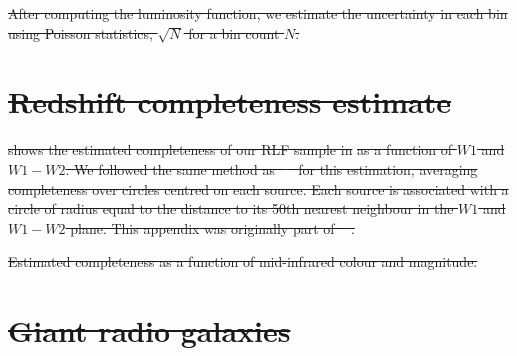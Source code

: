 \documentclass[11pt, a4paper]{book}
\providecommand{\DIFdeltex}[1]{{\protect\color{red}\sout{#1}}}                      %
\providecommand{\DIFdelFL}[1]{\DIFdel{#1}} %
\providecommand{\DIFdel}[1]{\texorpdfstring{\DIFdeltex{#1}}{}} %
\begin{document}
\DIFdel{After computing the luminosity function, we estimate the uncertainty in each bin using Poisson statistics, $\sqrt{N}$ for a bin count $N$.
}%

\section{\DIFdel{Redshift completeness estimate}}
\addtocounter{section}{-1}%

\DIFdel{shows the estimated completeness of our RLF sample in }%
\DIFdel{as a function of $W1$ and $W1-W2$. We followed the same method as \mbox{%
\citet{pracy16rlf} }\hspace{0pt}%
for this estimation, averaging completeness over circles centred on each source. Each source is associated with a circle of radius equal to the distance to its 50th nearest neighbour in the $W1$ and $W1-W2$ plane. This appendix was originally part of \mbox{%
\citet{alger21rlfs}}\hspace{0pt}%
.
}%

{%
\DIFdelFL{Estimated completeness as a function of mid-infrared colour and magnitude.}}

\section{\DIFdel{Giant radio galaxies}}
\addtocounter{section}{-1}%
\end{document}
